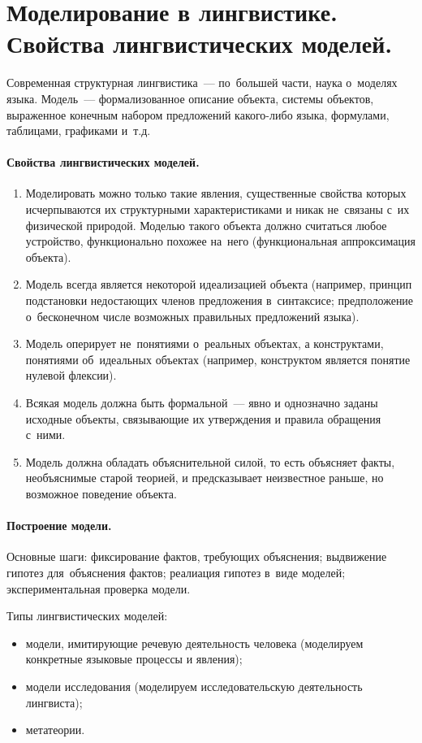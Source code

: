 \documentclass[12pt]{article}
\theoremstyle{definition}
\theoremstyle{remark}
\numberwithin{equation}{section}
\begin{document}
\section{Моделирование в лингвистике.  Свойства лингвистических 
моделей.}
Современная структурная лингвистика~--- по~большей части, наука 
о~моделях языка. Модель~--- формализованное описание объекта, 
системы объектов, выраженное конечным набором предложений какого-либо 
языка, формулами, таблицами, графиками и~т.д.

\paragraph{Свойства лингвистических моделей.}
\begin{enumerate}
	\item Моделировать можно только такие явления, существенные 
    свойства которых исчерпываются их структурными характеристиками 
    и никак не~связаны с~их физической природой. Моделью такого объекта 
    должно считаться любое устройство, функционально похожее на~него 
    (функциональная аппроксимация объекта).
	\item Модель всегда является некоторой идеализацией объекта 
    (например, принцип подстановки недостающих членов предложения 
    в~синтаксисе; предположение о~бесконечном числе возможных правильных 
    предложений языка).
	\item Модель оперирует не~понятиями о~реальных объектах, а конструктами, 
    понятиями об~идеальных объектах (например, конструктом является 
    понятие нулевой флексии).
	\item Всякая модель должна быть формальной~--- явно и однозначно 
    заданы исходные объекты, связывающие их утверждения и правила 
    обращения с~ними.
	\item Модель должна обладать объяснительной силой, то есть объясняет 
    факты, необъяснимые старой теорией, и предсказывает неизвестное раньше, 
    но возможное поведение объекта.
\end{enumerate}

\paragraph{Построение модели.}
Основные шаги: фиксирование фактов, требующих объяснения; выдвижение гипотез 
для~объяснения фактов; реалиация гипотез в~виде моделей; экспериментальная 
проверка модели.

Типы лингвистических моделей:
\begin{itemize}
	\item модели, имитирующие речевую деятельность человека (моделируем 
    конкретные языковые процессы и явления);
	\item модели исследования (моделируем исследовательскую деятельность 
    лингвиста);
	\item метатеории.
\end{itemize}
\end{document}
